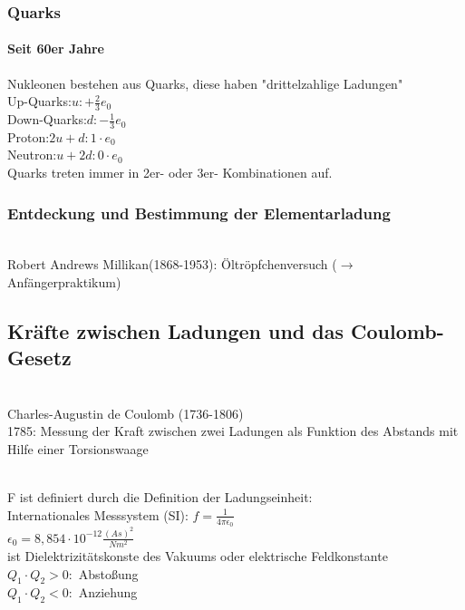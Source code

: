 \documentclass[11pt]{article}
\begin{document}
\newpage

\subsubsection{ Quarks }	
\paragraph{Seit 60er Jahre}
Nukleonen bestehen aus Quarks, diese haben "drittelzahlige Ladungen"
\\
Up-Quarks:$u:+\frac{2}{3	}e_0$
\\
Down-Quarks:$d:-\frac{1}{3}e_0$
\\
Proton:$2u+d: 1\cdot e_0$
\\
Neutron:$u+2d: 0\cdot e_0$
\\

Quarks treten immer in 2er- oder 3er- Kombinationen auf.
\\

\subsubsection{Entdeckung und Bestimmung der Elementarladung}
\\
Robert Andrews Millikan(1868-1953): Öltröpfchenversuch ($\rightarrow$ Anfängerpraktikum)

\subsection{Kräfte zwischen Ladungen und das Coulomb-Gesetz}
\\
Charles-Augustin de Coulomb (1736-1806)
\\
1785: Messung der Kraft zwischen zwei Ladungen als Funktion des Abstands mit Hilfe einer Torsionswaage
\linebreak\\


\linebreak\\
F ist definiert durch die Definition der Ladungseinheit:
\\
Internationales Messsystem (SI): $f=\frac{1}{4\pi\epsilon_0}$
\\
$\epsilon_0=8,854\cdot10^{-12}\frac{(As)^2}{Nm^2}$
\\
ist Dielektrizitätskonste des Vakuums oder elektrische Feldkonstante
\\
$Q_1\cdot Q_2 > 0:$ Abstoßung
\\
$Q_1\cdot Q_2 < 0:$ Anziehung
\end{document}
